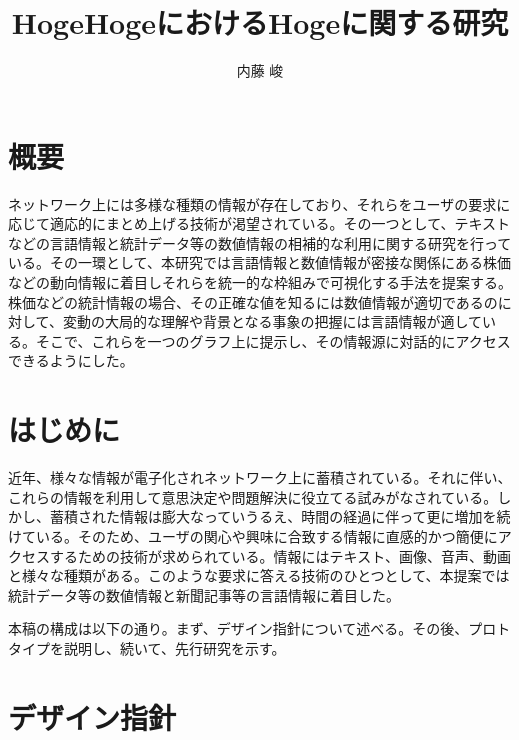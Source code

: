 \documentclass{matsushita-zemi}
\title{HogeHogeにおけるHogeに関する研究}
\author{内藤 峻}
\begin{document}
\maketitle

\section*{概要}
\label{abstract}
ネットワーク上には多様な種類の情報が存在しており、それらをユーザの要求に応じて適応的にまとめ上げる技術が渇望されている。その一つとして、テキストなどの言語情報と統計データ等の数値情報の相補的な利用に関する研究を行っている。その一環として、本研究では言語情報と数値情報が密接な関係にある株価などの動向情報に着目しそれらを統一的な枠組みで可視化する手法を提案する。株価などの統計情報の場合、その正確な値を知るには数値情報が適切であるのに対して、変動の大局的な理解や背景となる事象の把握には言語情報が適している。そこで、これらを一つのグラフ上に提示し、その情報源に対話的にアクセスできるようにした。\cite{Elucignage}\cite{Elucignage-jsai}\cite{information_compilation}\cite{Tagged_corpus}

\section{はじめに}
\label{background}
近年、様々な情報が電子化されネットワーク上に蓄積されている。それに伴い、これらの情報を利用して意思決定や問題解決に役立てる試みがなされている。しかし、蓄積された情報は膨大なっていうるえ、時間の経過に伴って更に増加を続けている。そのため、ユーザの関心や興味に合致する情報に直感的かつ簡便にアクセスするための技術が求められている\cite{基盤技術}\cite{可視化手法}。情報にはテキスト、画像、音声、動画と様々な種類がある。このような要求に答える技術のひとつとして、本提案では統計データ等の数値情報と新聞記事等の言語情報に着目した。

本稿の構成は以下の通り。まず、デザイン指針について述べる。その後、プロトタイプを説明し、続いて、先行研究を示す。

\section{デザイン指針}
\end{document}
